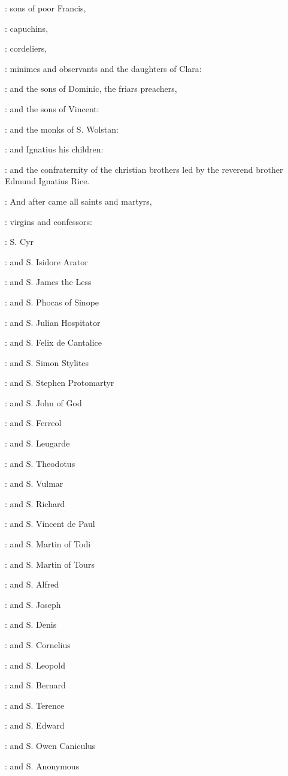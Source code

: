 :
sons of poor Francis,

:
capuchins,

:
cordeliers,

:
minimes and observants and the daughters of Clara:

:
and the sons of Dominic, the friars preachers,

:
and the sons of Vincent:

:
and the monks of S. Wolstan:

:
and Ignatius his children:

:
and the confraternity of the christian brothers
led by the reverend brother Edmund Ignatius Rice.

:
And after came all saints and martyrs,

:
virgins and confessors:

:
S. Cyr

:
and S. Isidore Arator

:
and S. James the Less 

:
and S. Phocas of Sinope 

:
and S. Julian Hospitator 

:
and S. Felix de Cantalice 

:
and S. Simon Stylites 

:
and S. Stephen Protomartyr 

:
and S. John of God 

:
and S. Ferreol 

:
and S. Leugarde 

:
and S. Theodotus 

:
and S. Vulmar 

:
and S. Richard 

:
and S. Vincent de Paul 

:
and S. Martin of Todi 

:
and S. Martin of Tours 

:
and S. Alfred 

:
and S. Joseph 

:
and S. Denis 

:
and S. Cornelius 

:
and S. Leopold 

:
and S. Bernard 

:
and S. Terence 

:
and S. Edward 

:
and S. Owen Caniculus 

:
and S. Anonymous 

